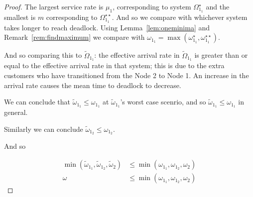 \documentclass{article}
\begin{document}
\begin{proof}
The largest service rate is $\mu_1$, corresponding to system $\Omega_{1_1}^{\star}$ and the smallest is $m$ corresponding to $\Omega_{1_1}^{\star\star}$.
And so we compare with whichever system takes longer to reach deadlock. Using Lemma~\ref{lem:oneminima} and Remark~\ref{rem:findmaximum} we compare with $\omega_{1_1} = \max(\omega_{1_1}^{\star}, \omega_{1_1}^{\star\star})$.

And so comparing this to $\widetilde{\Omega}_{1_1}$: the effective arrival rate in $\widetilde{\Omega}_{1_1}$ is greater than or equal to the effective arrival rate in that system; this is due to the extra customers who have transitioned from the Node 2 to Node 1. An increase in the arrival rate causes the mean time to deadlock to decrease.

We can conclude that $\widetilde{\omega}_{1_1} \leq \omega_{1_1}$ at $\widetilde{\omega}_{1_1}$'s worst case scenrio, and so $\widetilde{\omega}_{1_1} \leq \omega_{1_1}$ in general.

Similarly we can conclude $\widetilde{\omega}_{1_2} \leq \omega_{1_2}$.

And so

\begin{align*}
\min(\widetilde{\omega}_{1_1}, \widetilde{\omega}_{1_2}, \widetilde{\omega}_2) &\leq \min(\omega_{1_1}, \omega_{1_2}, \omega_2) \\
\omega &\leq \min(\omega_{1_1}, \omega_{1_2}, \omega_2)
\end{align*}

\end{proof}


\end{document}
